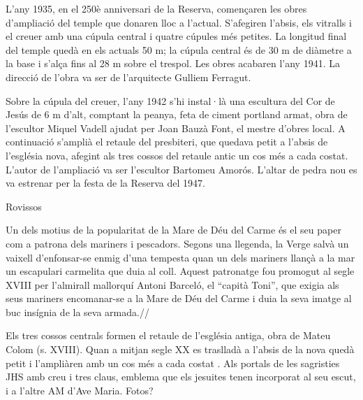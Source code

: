 L'any 1935,  en el 250è anniversari de la Reserva, començaren les obres d'ampliació del temple que donaren lloc a l'actual. S'afegiren l'absis, els vitralls i el creuer amb una cúpula central i quatre cúpules més petites. La longitud final del temple quedà en els actuals 50 m; la cúpula central és de 30 m de diàmetre a la base i s'alça fins al 28 m sobre el trespol. Les obres acabaren l'any 1941. La direcció de l'obra va ser de l'arquitecte Gulliem Ferragut.

Sobre la cúpula del creuer, l'any 1942 s’hi instal·là una escultura del Cor de Jesús de 6 m d'alt, comptant la peanya, feta de ciment portland armat, obra de l’escultor Miquel Vadell ajudat per Joan Bauzà Font, el mestre d'obres local. A continuació s'amplià el retaule del presbiteri, que quedava petit a l'absis de l'església nova, afegint als tres cossos del retaule antic un cos més a cada costat. L'autor de l'ampliació va ser l'escultor Bartomeu Amorós. L'altar de pedra nou es va estrenar per la festa de la Reserva del 1947.



Rovissos

Un dels motius de la popularitat de la Mare de Déu del Carme és el seu paper com a patrona dels mariners i pescadors. Segons una llegenda, la Verge salvà un vaixell d’enfonsar-se enmig d’una tempesta quan un dels mariners llançà a la mar un escapulari carmelita que duia al coll. Aquest patronatge fou promogut al segle XVIII per l’almirall mallorquí Antoni Barceló, el “capità Toni”, que exigia als seus mariners encomanar-se a la Mare de Déu del Carme i duia la seva imatge al buc insígnia de la seva armada.//

Els tres cossos centrals formen el retaule de l’església antiga, obra de Mateu Colom (s. XVIII). Quan a mitjan segle XX es traslladà a l’absis de la nova quedà petit i l’ampliàren amb un cos més a cada costat . Als portals de les sagristies JHS amb creu i tres claus, emblema que els jesuites tenen incorporat al seu escut, i a l’altre AM d’Ave Maria. Fotos?

